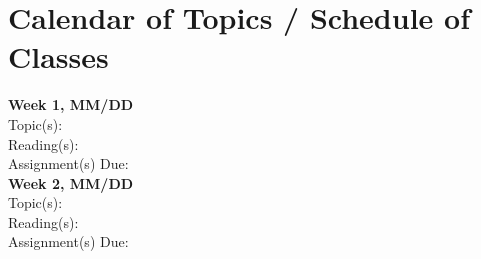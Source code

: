 \documentclass[12pt]{article}     %
\begin{document}

\section*{Calendar of Topics / Schedule of Classes}

\noindent \textbf{Week 1, MM/DD}\\
Topic(s): \\
Reading(s): \\
Assignment(s) Due: \\

\noindent \textbf{Week 2, MM/DD}\\
Topic(s): \\
Reading(s): \\
Assignment(s) Due: \\


\end{document}
